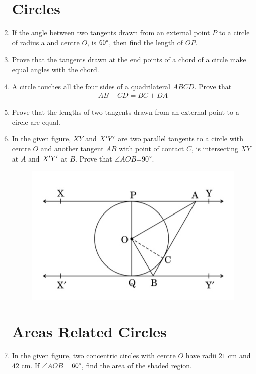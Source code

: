 \documentclass{article}
\begin{document}
\begin{enumerate}
\section*{Circles}
\item If the angle between two tangents drawn from an external point $P$ to a circle of radius a and centre $O$, is $60\degree$, then find the length of $OP$.
\item Prove that the tangents drawn at the end points of a chord of a circle make equal angles with the chord.
\item A circle touches all the four sides of a quadrilateral $ABCD$. Prove that
\begin{align*}
		AB + CD = BC +DA
\end{align*}
\item Prove that the lengths of two tangents drawn from an external point to a circle are equal.
\item In the given figure, $XY$ and $X\rq Y\rq$ are two parallel tangents to a circle with centre $O$ and another tangent $AB$ with point of contact $C$, is intersecting $XY$ at $A$ and $X\rq Y\rq$ at $B$. Prove that $\angle{AOB}$=90$\degree$.
\begin{figure}[H]
\centering
\includegraphics[width=0.8 \columnwidth]{Figs/Fig2.jpg}
\end{figure}

\section*{Areas Related Circles}
\item In the given figure, two concentric circles with  centre $O$ have radii $21$ cm and $42$ cm. If $\angle{AOB}$= $60\degree$, find the area of the shaded region.


\end{enumerate}
\end{document}
